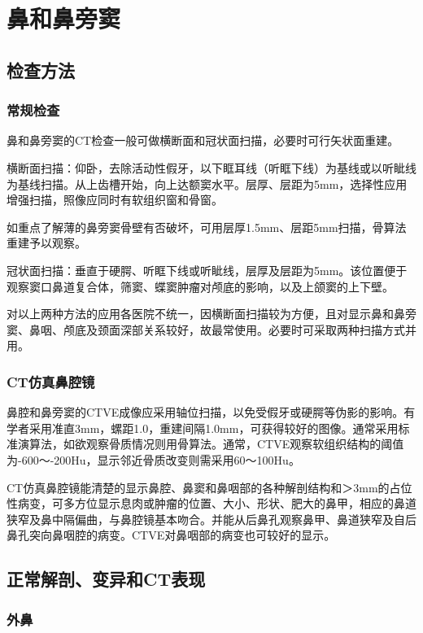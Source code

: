 \chapter{鼻和鼻旁窦}

\section{检查方法}

\subsection{常规检查}

鼻和鼻旁窦的CT检查一般可做横断面和冠状面扫描，必要时可行矢状面重建。

横断面扫描：仰卧，去除活动性假牙，以下眶耳线（听眶下线）为基线或以听眦线为基线扫描。从上齿槽开始，向上达额窦水平。层厚、层距为5mm，选择性应用增强扫描，照像应同时有软组织窗和骨窗。

如重点了解薄的鼻旁窦骨壁有否破坏，可用层厚1.5mm、层距5mm扫描，骨算法重建予以观察。

冠状面扫描：垂直于硬腭、听眶下线或听眦线，层厚及层距为5mm。该位置便于观察窦口鼻道复合体，筛窦、蝶窦肿瘤对颅底的影响，以及上颌窦的上下壁。

对以上两种方法的应用各医院不统一，因横断面扫描较为方便，且对显示鼻和鼻旁窦、鼻咽、颅底及颈面深部关系较好，故最常使用。必要时可采取两种扫描方式并用。

\subsection{CT仿真鼻腔镜}

鼻腔和鼻旁窦的CTVE成像应采用轴位扫描，以免受假牙或硬腭等伪影的影响。有学者采用准直3mm，螺距1.0，重建间隔1.0mm，可获得较好的图像。通常采用标准演算法，如欲观察骨质情况则用骨算法。通常，CTVE观察软组织结构的阈值为-600～-200Hu，显示邻近骨质改变则需采用60～100Hu。

CT仿真鼻腔镜能清楚的显示鼻腔、鼻窦和鼻咽部的各种解剖结构和＞3mm的占位性病变，可多方位显示息肉或肿瘤的位置、大小、形状、肥大的鼻甲，相应的鼻道狭窄及鼻中隔偏曲，与鼻腔镜基本吻合。并能从后鼻孔观察鼻甲、鼻道狭窄及自后鼻孔突向鼻咽腔的病变。CTVE对鼻咽部的病变也可较好的显示。

\section{正常解剖、变异和CT表现}

\subsection{外鼻}

